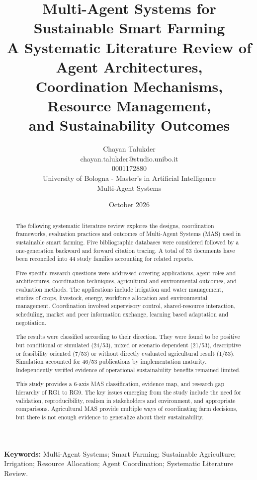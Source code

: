 \documentclass[11pt,a4paper]{article}
\title{
    \textbf{Multi-Agent Systems for Sustainable Smart Farming}\\[0.5cm]
    \large
    A Systematic Literature Review of Agent Architectures,\\
    Coordination Mechanisms, Resource Management,\\
    and Sustainability Outcomes
}
\author{
    Chayan Talukder\\[4pt]
    {\small chayan.talukder@studio.unibo.it}\\
    {\small 0001172880}\\[8pt]
    University of Bologna - Master's in Artificial Intelligence\\
    Multi-Agent Systems
}
\date{October 2026}
\begin{document}
\maketitle




\begin{abstract}

The following systematic literature review explores the designs, coordination frameworks, evaluation practices and outcomes of Multi-Agent Systems (MAS) used in sustainable smart farming. Five bibliographic databases were considered followed by a one-generation backward and forward citation tracing. A total of 53 documents have been reconciled into 44 study families accounting for related reports.

Five specific research questions were addressed covering applications, agent roles and architectures, coordination techniques, agricultural and environmental outcomes, and evaluation methods. The applications include irrigation and water management, studies of crops, livestock, energy, workforce allocation and environmental management. Coordination involved supervisory control, shared-resource interaction, scheduling, market and peer information exchange, learning based adaptation and negotiation.

The results were classified according to their direction. They were found to be positive but conditional or simulated (24/53), mixed or scenario dependent (21/53), descriptive or feasibility oriented (7/53) or without directly evaluated agricultural result (1/53). Simulation accounted for 46/53 publications by implementation maturity. Independently verified evidence of operational sustainability benefits remained limited.

This study provides a 6-axis MAS classification, evidence map, and
research gap hierarchy of RG1 to RG9. The key issues emerging from the study include the need for validation, reproducibility, realism in stakeholders and environment, and appropriate comparisons. Agricultural MAS provide multiple ways of coordinating farm decisions, but there is not enough evidence to generalize about their sustainability.

\end{abstract}

\noindent\textbf{Keywords:}
Multi-Agent Systems; Smart Farming;
Sustainable Agriculture; Irrigation;
Resource Allocation; Agent Coordination;
Systematic Literature Review.
\end{document}

